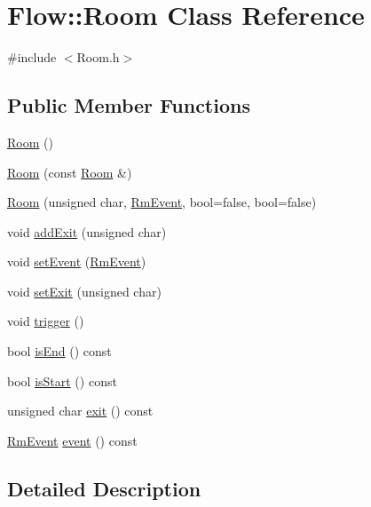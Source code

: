 \hypertarget{class_flow_1_1_room}{}\section{Flow\+:\+:Room Class Reference}
\label{class_flow_1_1_room}


{\ttfamily \#include $<$Room.\+h$>$}

\subsection*{Public Member Functions}
\begin{DoxyCompactItemize}
\item 
\hyperlink{class_flow_1_1_room_acbd4ea4683660ee3f5120b396e3d9e67}{Room} ()
\item 
\hyperlink{class_flow_1_1_room_ab9bb4be79ce8b04be3537a6fc308dad4}{Room} (const \hyperlink{class_flow_1_1_room}{Room} \&)
\item 
\hyperlink{class_flow_1_1_room_ab72d88a0660f8d836fc8edc18ded95dc}{Room} (unsigned char, \hyperlink{namespace_flow_a01e62c2d0a9c24924a2fce4b667dd9d8}{Rm\+Event}, bool=false, bool=false)
\item 
void \hyperlink{class_flow_1_1_room_ac6f5f04b58afe0002ced970c6068c503}{add\+Exit} (unsigned char)
\item 
void \hyperlink{class_flow_1_1_room_a578035b5ca2e174d76dae9916c008a52}{set\+Event} (\hyperlink{namespace_flow_a01e62c2d0a9c24924a2fce4b667dd9d8}{Rm\+Event})
\item 
void \hyperlink{class_flow_1_1_room_a7e51216a03e8acec7535098bee3edcb9}{set\+Exit} (unsigned char)
\item 
void \hyperlink{class_flow_1_1_room_a83ff2a5cb0b32dace3839cbbca2cfc33}{trigger} ()
\item 
bool \hyperlink{class_flow_1_1_room_a2a41303b2f9856fd8d9f7fcf7feccab5}{is\+End} () const
\item 
bool \hyperlink{class_flow_1_1_room_ad5fe3a89b1a14b1619f920f624953ff6}{is\+Start} () const
\item 
unsigned char \hyperlink{class_flow_1_1_room_afddbff9ee70421d5df3dbbf202afe35f}{exit} () const
\item 
\hyperlink{namespace_flow_a01e62c2d0a9c24924a2fce4b667dd9d8}{Rm\+Event} \hyperlink{class_flow_1_1_room_a5f32585a64d31afb8add2d20eb884a85}{event} () const
\end{DoxyCompactItemize}


\subsection{Detailed Description}



